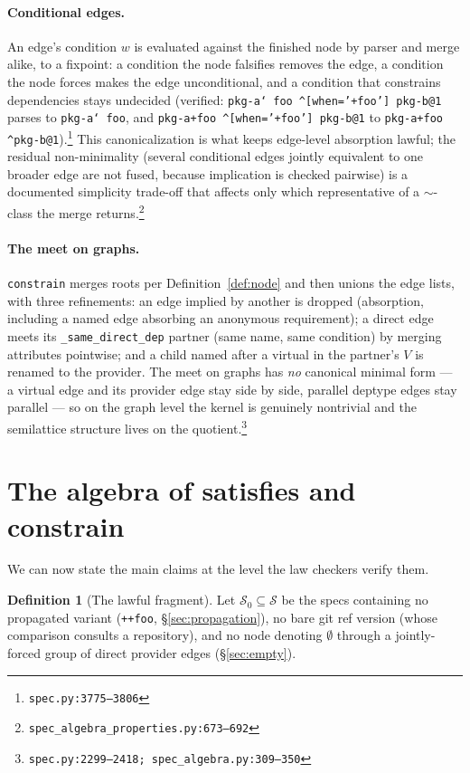 \documentclass[11pt]{article}
\theoremstyle{definition}
\newtheorem{definition}[theorem]{Definition}
\theoremstyle{remark}
\renewcommand{\ker}{\sim}
\newcommand{\Spec}{\mathcal{S}}
\newcommand{\code}[1]{\texttt{#1}}
\newcommand{\src}[1]{\footnote{\code{#1}}}
\begin{document}
\paragraph{Conditional edges.}
An edge's condition $w$ is evaluated against the finished node by parser and
merge alike, to a fixpoint: a condition the node falsifies removes the edge, a
condition the node forces makes the edge unconditional, and a condition that
constrains dependencies stays undecided (verified: \code{pkg-a\char`~foo
\^{}[when='+foo'] pkg-b@1} parses to \code{pkg-a\char`~foo}, and
\code{pkg-a+foo \^{}[when='+foo'] pkg-b@1} to \code{pkg-a+foo
\^{}pkg-b@1}).\src{spec.py:3775--3806}  This canonicalization is what keeps
edge-level absorption lawful; the residual non-minimality (several conditional
edges jointly equivalent to one broader edge are not fused, because
implication is checked pairwise) is a documented simplicity trade-off that
affects only which representative of a $\ker$-class the merge
returns.\src{spec\_algebra\_properties.py:673--692}

\paragraph{The meet on graphs.}
\code{constrain} merges roots per Definition~\ref{def:node} and then unions
the edge lists, with three refinements: an edge implied by another is dropped
(absorption, including a named edge absorbing an anonymous requirement); a
direct edge meets its \code{\_same\_direct\_dep} partner (same name, same
condition) by merging attributes pointwise; and a child named after a virtual
in the partner's $V$ is renamed to the provider.  The meet on graphs has
\emph{no} canonical minimal form --- a virtual edge and its provider edge stay
side by side, parallel deptype edges stay parallel --- so on the graph level
the kernel is genuinely nontrivial and the semilattice structure lives on the
quotient.\src{spec.py:2299--2418; spec\_algebra.py:309--350}

\section{The algebra of satisfies and constrain}\label{sec:algebra}

We can now state the main claims at the level the law checkers verify them.

\begin{definition}[The lawful fragment]\label{def:fragment}
Let $\Spec_0 \subseteq \Spec$ be the specs containing no propagated variant
(\code{++foo}, \S\ref{sec:propagation}), no bare git ref version (whose
comparison consults a repository), and no node denoting $\emptyset$ through a
jointly-forced group of direct provider edges (\S\ref{sec:empty}).
\end{definition}
\end{document}

